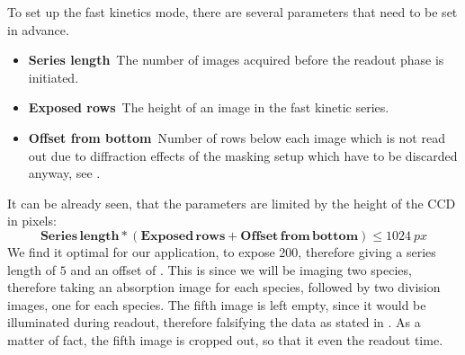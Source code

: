 
To set up the fast kinetics mode, there are several parameters that need to be set in advance.
\begin{itemize}
	\item \textbf{Series length}\, The number of images acquired before the readout phase is initiated.
	\item \textbf{Exposed rows}\, The height of an image in the fast kinetic series.
	\item \textbf{Offset from bottom}\, Number of rows below each image which is not read out due to diffraction effects of the masking setup which have to be discarded anyway, see .
\end{itemize}

It can be already seen, that the parameters are limited by the height of the CCD in pixels:
\begin{equation}
\mathbf{Series\,length} * (\mathbf{Exposed\,rows} + \mathbf{Offset\,from\,bottom}) \leq \SI{1024}{px}
\end{equation}
We find it optimal for our application, to expose \SI{200}{\px}, therefore giving a series length of $5$ and an offset of . This is since we will be imaging two species, therefore taking an absorption image for each species, followed by two division images, one for each species. The fifth image is left empty, since it would be illuminated during readout, therefore falsifying the data as stated in . As a matter of fact, the fifth image is cropped out, so that it even the readout time.

